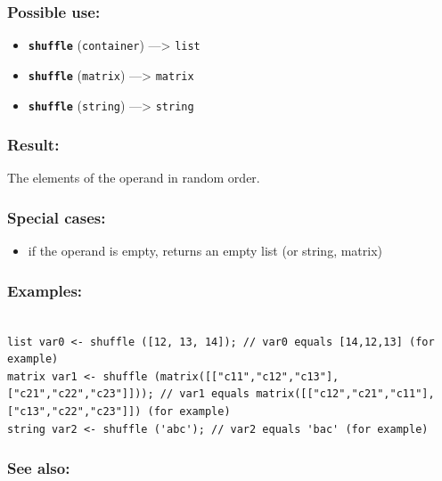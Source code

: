\documentclass[]{book}
\providecommand{\tightlist}{%
  \setlength{\itemsep}{0pt}\setlength{\parskip}{0pt}}
\theoremstyle{definition}
\theoremstyle{definition}
\theoremstyle{definition}
\theoremstyle{remark}
\begin{document}
\subsubsection{Possible use:}\label{possible-use-471}

\begin{itemize}
\tightlist
\item
  \textbf{\texttt{shuffle}} (\texttt{container}) ---\textgreater{}
  \texttt{list}
\item
  \textbf{\texttt{shuffle}} (\texttt{matrix}) ---\textgreater{}
  \texttt{matrix}
\item
  \textbf{\texttt{shuffle}} (\texttt{string}) ---\textgreater{}
  \texttt{string}
\end{itemize}

\subsubsection{Result:}\label{result-455}

The elements of the operand in random order.

\subsubsection{Special cases:}\label{special-cases-121}

\begin{itemize}
\tightlist
\item
  if the operand is empty, returns an empty list (or string, matrix)
\end{itemize}

\subsubsection{Examples:}\label{examples-327}

\begin{verbatim}
 
list var0 <- shuffle ([12, 13, 14]); // var0 equals [14,12,13] (for example) 
matrix var1 <- shuffle (matrix([["c11","c12","c13"],["c21","c22","c23"]])); // var1 equals matrix([["c12","c21","c11"],["c13","c22","c23"]]) (for example) 
string var2 <- shuffle ('abc'); // var2 equals 'bac' (for example)
\end{verbatim}

\subsubsection{See also:}\label{see-also-183}
\end{document}
